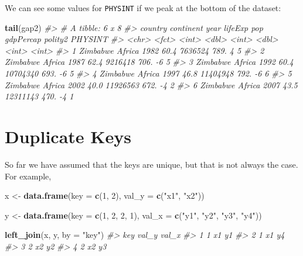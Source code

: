 \documentclass[
]{book}
\newenvironment{Shaded}{\begin{snugshade}}{\end{snugshade}}
\newcommand{\CommentTok}[1]{\textcolor[rgb]{0.56,0.35,0.01}{\textit{#1}}}
\newcommand{\DataTypeTok}[1]{\textcolor[rgb]{0.13,0.29,0.53}{#1}}
\newcommand{\DecValTok}[1]{\textcolor[rgb]{0.00,0.00,0.81}{#1}}
\newcommand{\KeywordTok}[1]{\textcolor[rgb]{0.13,0.29,0.53}{\textbf{#1}}}
\newcommand{\NormalTok}[1]{#1}
\newcommand{\StringTok}[1]{\textcolor[rgb]{0.31,0.60,0.02}{#1}}
\begin{document}
We can see some values for \texttt{PHYSINT} if we peak at the bottom of the dataset:

\begin{Shaded}
\begin{Highlighting}[]
\KeywordTok{tail}\NormalTok{(gap2)}
\CommentTok{#> # A tibble: 6 x 8}
\CommentTok{#>   country  continent  year lifeExp      pop gdpPercap polity2 PHYSINT}
\CommentTok{#>   <chr>    <fct>     <int>   <dbl>    <int>     <dbl>   <int>   <int>}
\CommentTok{#> 1 Zimbabwe Africa     1982    60.4  7636524      789.       4       5}
\CommentTok{#> 2 Zimbabwe Africa     1987    62.4  9216418      706.      -6       5}
\CommentTok{#> 3 Zimbabwe Africa     1992    60.4 10704340      693.      -6       5}
\CommentTok{#> 4 Zimbabwe Africa     1997    46.8 11404948      792.      -6       6}
\CommentTok{#> 5 Zimbabwe Africa     2002    40.0 11926563      672.      -4       2}
\CommentTok{#> 6 Zimbabwe Africa     2007    43.5 12311143      470.      -4       1}
\end{Highlighting}
\end{Shaded}

\hypertarget{duplicate-keys}{%
\section{Duplicate Keys}\label{duplicate-keys}}

So far we have assumed that the keys are unique, but that is not always the case. For example,

\begin{Shaded}
\begin{Highlighting}[]
\NormalTok{x <-}\StringTok{ }\KeywordTok{data.frame}\NormalTok{(}\DataTypeTok{key =} \KeywordTok{c}\NormalTok{(}\DecValTok{1}\NormalTok{, }\DecValTok{2}\NormalTok{),}
               \DataTypeTok{val_y =} \KeywordTok{c}\NormalTok{(}\StringTok{"x1"}\NormalTok{, }\StringTok{"x2"}\NormalTok{))}

\NormalTok{y <-}\StringTok{ }\KeywordTok{data.frame}\NormalTok{(}\DataTypeTok{key =} \KeywordTok{c}\NormalTok{(}\DecValTok{1}\NormalTok{, }\DecValTok{2}\NormalTok{, }\DecValTok{2}\NormalTok{, }\DecValTok{1}\NormalTok{),}
               \DataTypeTok{val_x =} \KeywordTok{c}\NormalTok{(}\StringTok{"y1"}\NormalTok{, }\StringTok{"y2"}\NormalTok{, }\StringTok{"y3"}\NormalTok{, }\StringTok{"y4"}\NormalTok{))}

\KeywordTok{left_join}\NormalTok{(x, y, }\DataTypeTok{by =} \StringTok{"key"}\NormalTok{)}
\CommentTok{#>   key val_y val_x}
\CommentTok{#> 1   1    x1    y1}
\CommentTok{#> 2   1    x1    y4}
\CommentTok{#> 3   2    x2    y2}
\CommentTok{#> 4   2    x2    y3}
\end{Highlighting}
\end{Shaded}
\end{document}
